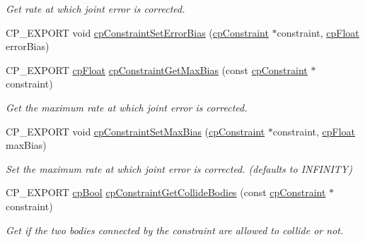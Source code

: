 \begin{DoxyCompactItemize}
\begin{DoxyCompactList}\small\item\em Get rate at which joint error is corrected. \end{DoxyCompactList}\item 
C\+P\+\_\+\+E\+X\+P\+O\+RT void \mbox{\hyperlink{group__cp_constraint_gacd4448af488e19721f3755f9ddaece9d}{cp\+Constraint\+Set\+Error\+Bias}} (\mbox{\hyperlink{structcp_constraint}{cp\+Constraint}} $\ast$constraint, \mbox{\hyperlink{group__basic_types_gac1ed65573e035bf892505768c852d8d3}{cp\+Float}} error\+Bias)
\item 
\mbox{\label{group__cp_constraint_ga7218069af911d5886d6562f8b62e844d}} 
C\+P\+\_\+\+E\+X\+P\+O\+RT \mbox{\hyperlink{group__basic_types_gac1ed65573e035bf892505768c852d8d3}{cp\+Float}} \mbox{\hyperlink{group__cp_constraint_ga7218069af911d5886d6562f8b62e844d}{cp\+Constraint\+Get\+Max\+Bias}} (const \mbox{\hyperlink{structcp_constraint}{cp\+Constraint}} $\ast$constraint)
\begin{DoxyCompactList}\small\item\em Get the maximum rate at which joint error is corrected. \end{DoxyCompactList}\item 
\mbox{\label{group__cp_constraint_ga22259bf6a01a04075e17c24c6167ced4}} 
C\+P\+\_\+\+E\+X\+P\+O\+RT void \mbox{\hyperlink{group__cp_constraint_ga22259bf6a01a04075e17c24c6167ced4}{cp\+Constraint\+Set\+Max\+Bias}} (\mbox{\hyperlink{structcp_constraint}{cp\+Constraint}} $\ast$constraint, \mbox{\hyperlink{group__basic_types_gac1ed65573e035bf892505768c852d8d3}{cp\+Float}} max\+Bias)
\begin{DoxyCompactList}\small\item\em Set the maximum rate at which joint error is corrected. (defaults to I\+N\+F\+I\+N\+I\+TY) \end{DoxyCompactList}\item 
\mbox{\label{group__cp_constraint_gab01d5a088b2f2882d8b00fbd11cb5dd5}} 
C\+P\+\_\+\+E\+X\+P\+O\+RT \mbox{\hyperlink{group__basic_types_gabc5e752c48f3449ca26ef413ecbd647e}{cp\+Bool}} \mbox{\hyperlink{group__cp_constraint_gab01d5a088b2f2882d8b00fbd11cb5dd5}{cp\+Constraint\+Get\+Collide\+Bodies}} (const \mbox{\hyperlink{structcp_constraint}{cp\+Constraint}} $\ast$constraint)
\begin{DoxyCompactList}\small\item\em Get if the two bodies connected by the constraint are allowed to collide or not. \end{DoxyCompactList}\item 

\end{DoxyCompactItemize}

